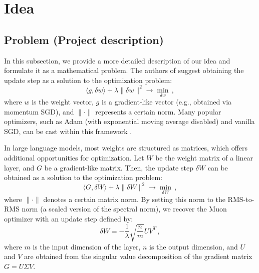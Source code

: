 \documentclass{article} %
\newcommand{\norm}[1]{\lVert #1\rVert}
\begin{document}
\iffalse

\section{Idea}

\subsection{Problem (Project description)}

In this subsection, we provide a more detailed description of our idea and formulate it as a mathematical problem. The authors of \cite{bernstein2024oldoptimizernewnorm} suggest obtaining the update step as a solution to the optimization problem:
\begin{equation}
    \langle g, \delta w \rangle + \lambda \norm{\delta w}^2 \to \min_{\delta w}\,,
\end{equation}
where $w$ is the weight vector, $g$ is a gradient-like vector (e.g., obtained via momentum SGD), and $\norm{\cdot}$ represents a certain norm. Many popular optimizers, such as Adam (with exponential moving average disabled) and vanilla SGD, can be cast within this framework \cite{bernstein2024oldoptimizernewnorm}.

In large language models, most weights are structured as matrices, which offers additional opportunities for optimization. Let $W$ be the weight matrix of a linear layer, and $G$ be a gradient-like matrix. Then, the update step $\delta W$ can be obtained as a solution to the optimization problem:
\begin{equation}\label{eqn:opt_problem_mat}
  \langle G, \delta W \rangle + \lambda \norm{\delta W}^2 \to \min_{\delta W}\,,
\end{equation}
where $\norm{\cdot}$ denotes a certain matrix norm. By setting this norm to the RMS-to-RMS norm (a scaled version of the spectral norm), we recover the Muon optimizer \cite{bernstein2025deriving, bernstein2024oldoptimizernewnorm} with an update step defined by:
\begin{equation}\label{eqn:update_muon}
\delta W = - \frac{1}{\lambda}\sqrt{\frac{n}{m}}UV^T\,,
\end{equation}
where $m$ is the input dimension of the layer, $n$ is the output dimension, and $U$ and $V$ are obtained from the singular value decomposition of the gradient matrix $G = U \Sigma V$.
\end{document}
